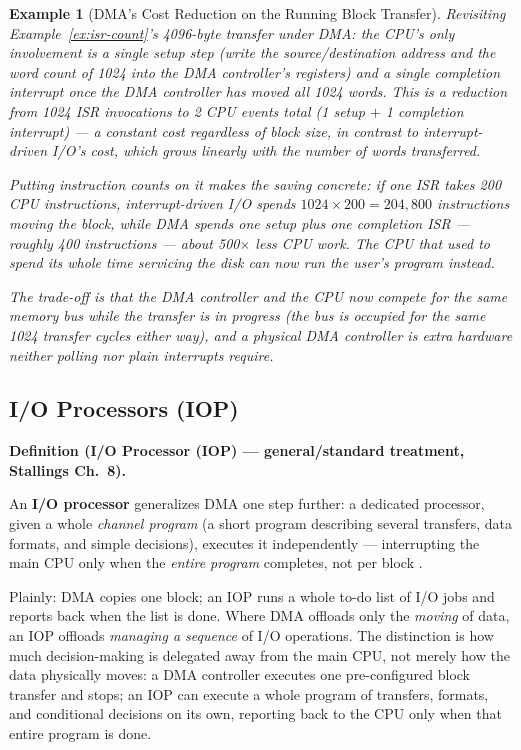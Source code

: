 \documentclass[11pt]{article}
\newtheorem{example}{Example}[section]
\newenvironment{definitionbox}[1]{%
  \par\noindent\textbf{Definition (#1).}\ \itshape
}{\par\vspace{0.3em}}
\begin{document}
\begin{example}[DMA's Cost Reduction on the Running Block Transfer]
\label{ex:dma-cost}
Revisiting Example~\ref{ex:isr-count}'s 4096-byte transfer under DMA: the CPU's only involvement is a single setup step (write the source/destination address and the word count of 1024 into the DMA controller's registers) and a single completion interrupt once the DMA controller has moved all 1024 words. This is a reduction from 1024 ISR invocations to 2 CPU events total (1 setup $+$ 1 completion interrupt) --- a constant cost regardless of block size, in contrast to interrupt-driven I/O's cost, which grows linearly with the number of words transferred.

Putting instruction counts on it makes the saving concrete: if one ISR takes 200 CPU instructions, interrupt-driven I/O spends $1024\times200 = 204{,}800$ instructions moving the block, while DMA spends one setup plus one completion ISR --- roughly 400 instructions --- about \emph{500$\times$ less} CPU work. The CPU that used to spend its whole time servicing the disk can now run the user's program instead.

The trade-off is that the DMA controller and the CPU now compete for the same memory bus while the transfer is in progress (the bus is occupied for the same 1024 transfer cycles either way), and a physical DMA controller is extra hardware neither polling nor plain interrupts require.
\end{example}

\subsection{I/O Processors (IOP)}

\begin{definitionbox}{I/O Processor (IOP) --- general/standard treatment, Stallings Ch.~8}
An \textbf{I/O processor} generalizes DMA one step further: a dedicated processor, given a whole \emph{channel program} (a short program describing several transfers, data formats, and simple decisions), executes it independently --- interrupting the main CPU only when the \emph{entire program} completes, not per block \cite{Stallings2015_computer_organization}.
\end{definitionbox}

Plainly: DMA copies one block; an IOP runs a whole to-do list of I/O jobs and reports back when the list is done. Where DMA offloads only the \emph{moving} of data, an IOP offloads \emph{managing a sequence} of I/O operations. The distinction is how much decision-making is delegated away from the main CPU, not merely how the data physically moves: a DMA controller executes one pre-configured block transfer and stops; an IOP can execute a whole program of transfers, formats, and conditional decisions on its own, reporting back to the CPU only when that entire program is done.
\end{document}
